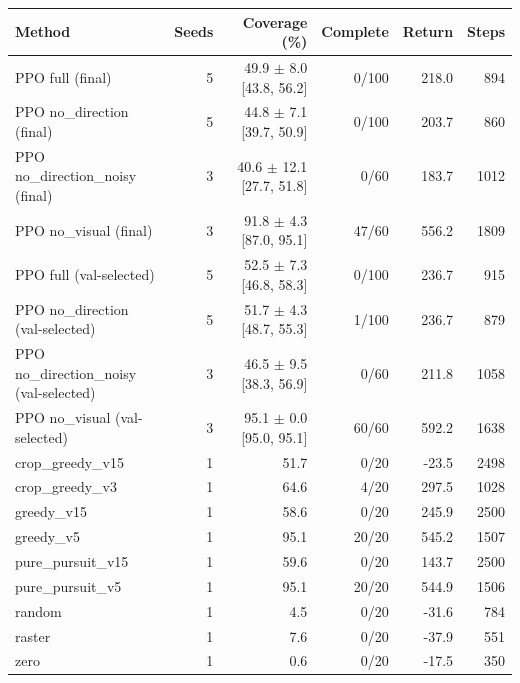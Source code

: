 \begin{tabular}{lrrrrr}
\toprule
Method & Seeds & Coverage (\%) & Complete & Return & Steps \\
\midrule
PPO full (final) & 5 & 49.9 $\pm$ 8.0 [43.8, 56.2] & 0/100 & 218.0 & 894 \\
PPO no_direction (final) & 5 & 44.8 $\pm$ 7.1 [39.7, 50.9] & 0/100 & 203.7 & 860 \\
PPO no_direction_noisy (final) & 3 & 40.6 $\pm$ 12.1 [27.7, 51.8] & 0/60 & 183.7 & 1012 \\
PPO no_visual (final) & 3 & 91.8 $\pm$ 4.3 [87.0, 95.1] & 47/60 & 556.2 & 1809 \\
PPO full (val-selected) & 5 & 52.5 $\pm$ 7.3 [46.8, 58.3] & 0/100 & 236.7 & 915 \\
PPO no_direction (val-selected) & 5 & 51.7 $\pm$ 4.3 [48.7, 55.3] & 1/100 & 236.7 & 879 \\
PPO no_direction_noisy (val-selected) & 3 & 46.5 $\pm$ 9.5 [38.3, 56.9] & 0/60 & 211.8 & 1058 \\
PPO no_visual (val-selected) & 3 & 95.1 $\pm$ 0.0 [95.0, 95.1] & 60/60 & 592.2 & 1638 \\
crop\_greedy\_v15 & 1 & 51.7 & 0/20 & -23.5 & 2498 \\
crop\_greedy\_v3 & 1 & 64.6 & 4/20 & 297.5 & 1028 \\
greedy\_v15 & 1 & 58.6 & 0/20 & 245.9 & 2500 \\
greedy\_v5 & 1 & 95.1 & 20/20 & 545.2 & 1507 \\
pure\_pursuit\_v15 & 1 & 59.6 & 0/20 & 143.7 & 2500 \\
pure\_pursuit\_v5 & 1 & 95.1 & 20/20 & 544.9 & 1506 \\
random & 1 & 4.5 & 0/20 & -31.6 & 784 \\
raster & 1 & 7.6 & 0/20 & -37.9 & 551 \\
zero & 1 & 0.6 & 0/20 & -17.5 & 350 \\
\bottomrule
\end{tabular}